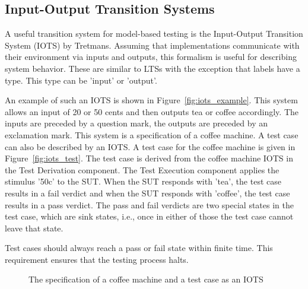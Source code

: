 \subsection{Input-Output Transition Systems}
A useful transition system for model-based testing is the Input-Output Transition System (IOTS) by Tretmans\cite{Tretmans:testgeneration}. Assuming that implementations communicate with their environment via inputs and outputs, this formalism is useful for describing system behavior. These are similar to LTSs with the exception that labels have a type. This type can be 'input' or 'output'. 

An example of such an IOTS is shown in Figure~\ref{fig:iots_example}. This system allows an input of 20 or 50 cents and then outputs tea or coffee accordingly. The inputs are preceded by a question mark, the outputs are preceded by an exclamation mark. This system is a specification of a coffee machine. A test case can also be described by an IOTS. A test case for the coffee machine is given in Figure~\ref{fig:iots_test}. The test case is derived from the coffee machine IOTS in the Test Derivation component. The Test Execution component applies the stimulus '50c' to the SUT. When the SUT responds with 'tea', the test case results in a fail verdict and when the SUT responds with 'coffee', the test case results in a pass verdict. The pass and fail verdicts are two special states in the test case, which are sink states, i.e., once in either of those the test case cannot leave that state. 

Test cases should always reach a pass or fail state within finite time. This requirement ensures that the testing process halts.
\begin{figure}[h]
  \begin{center}
    \subfloat[An IOTS]{\label{fig:iots_example}}
  \end{center}
  \caption{The specification of a coffee machine and a test case as an IOTS}
\end{figure}


